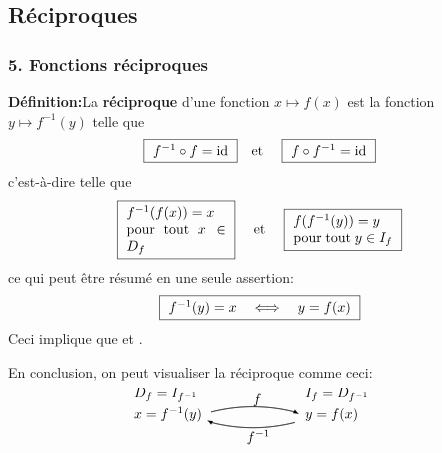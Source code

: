 \documentclass[10pt]{beamer}
\newcommand{\id}{\mathrm{id}}
\begin{document}
\subsection{R\'eciproques} 

\begin{frame}
\frametitle{\bf 5. Fonctions r\'eciproques}
\medskip 

{\bf D\'efinition:}\quad La {\bf r\'eciproque} d'une fonction $x\mapsto f(x)$ 
est la fonction $y\mapsto f^{-1}(y)$ telle que 
$$
\mbox{
\framebox{\ $f^{-1}\circ f=\id$\ }\quad et \quad 
\framebox{\ $f\circ f^{-1}=\id$\ }
}
$$
c'est-\`a-dire telle que 
$$
\mbox{
\framebox{\ \parbox{2.5cm}{$f^{-1}(f(x))=x$ \\ pour tout $x\in D_f$}\ }
\quad et \quad 
\framebox{\ \parbox{2.5cm}{$f(f^{-1}(y))=y$ \\ pour tout $y\in I_f$}\ }
}
$$
\pause
ce qui peut \^etre r\'esum\'e en une seule assertion: 
$$
\mbox{
\framebox{\ $f^{-1}(y)=x \quad\Longleftrightarrow\quad y=f(x)$\ }
}
$$
\pause
Ceci implique que\quad 
{}\quad et \quad 
{}. 
\vspace*{2mm}

\pause
En conclusion, on peut visualiser la r\'eciproque comme ceci:
$$
\begin{picture}(120,30)(-55,-10)
\setlength{\unitlength}{1.5pt}
\put(-57,10){$D_f=I_{f^{-1}}$}
\put(-57,0){$x=f^{-1}(y)$}
\qbezier(-20,3)(0,8)(20,3)
\put(20,3){\vector(2,-1){2}}
\put(0,7){$f$}
\put(25,0){$y=f(x)$}
\put(25,10){$I_f=D_{f^{-1}}$}
\qbezier(-20,-2)(0,-7)(20,-2)
\put(-20,-2){\vector(-2,1){2}}
\put(-3,-11){$f^{-1}$}
\end{picture}
$$

\end{frame}

\end{document}
